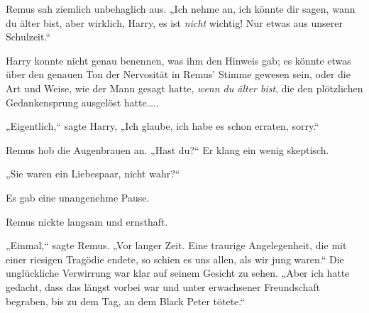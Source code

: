 Remus sah ziemlich unbehaglich aus. „Ich nehme an, ich könnte dir sagen, wann du älter bist, aber wirklich, Harry, es ist \emph{nicht} wichtig! Nur etwas aus unserer Schulzeit.“

Harry konnte nicht genau benennen, was ihm den Hinweis gab; es könnte etwas über den genauen Ton der Nervosität in Remus' Stimme gewesen sein, oder die Art und Weise, wie der Mann gesagt hatte, \emph{wenn du älter bist}, die den plötzlichen Gedankensprung ausgelöst hatte…..

„Eigentlich,“ sagte Harry, „Ich glaube, ich habe es schon erraten, sorry.“

Remus hob die Augenbrauen an. „Hast du?“ Er klang ein wenig skeptisch.

„Sie waren ein Liebespaar, nicht wahr?“

Es gab eine unangenehme Pause.

Remus nickte langsam und ernsthaft.

„Einmal,“ sagte Remus. „Vor langer Zeit. Eine traurige Angelegenheit, die mit einer riesigen Tragödie endete, so schien es uns allen, als wir jung waren.“ Die unglückliche Verwirrung war klar auf seinem Gesicht zu sehen. „Aber ich hatte gedacht, dass das längst vorbei war und unter erwachsener Freundschaft begraben, bis zu dem Tag, an dem Black Peter tötete.“

